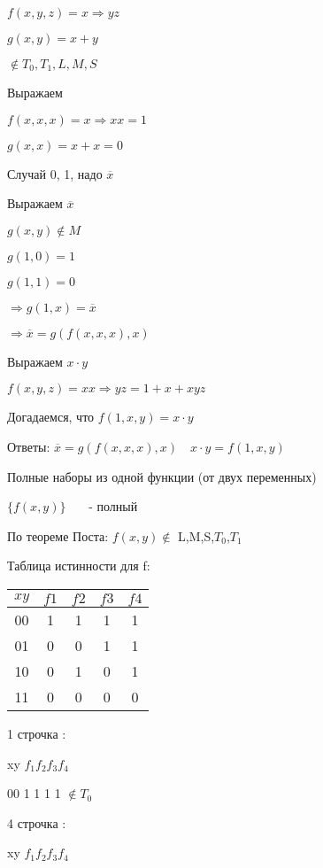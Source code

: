 \documentclass[russian]{lecture-notes}
\begin{document}
\begin{example}
	$f(x, y, z) = x \Rightarrow yz$
	
	
	$g(x, y) = x + y$
	
	$\notin T_0, T_1, L, M, S$
	
	Выражаем
	
	$f(x, x, x) = x \Rightarrow xx = 1$
	
	$g(x, x) = x + x = 0$
	
	Случай 0, 1, надо $\overline{x}$
	
	Выражаем $\overline{x}$
	
	$g(x, y) \notin M$
	
	$g(1, 0) = 1$
	
	$g(1, 1) = 0$
	
	$\Rightarrow g(1, x) = \overline{x}$
	
	$\Rightarrow \overline{x} = g(f(x, x, x), x)$
	
	Выражаем $x \cdot y$
	
	$f(x, y, z) = xx \Rightarrow yz = 1 + x + xyz$
	
	Догадаемся, что $f(1, x, y) = x \cdot y$
	
	Ответы: $\overline{x} = g(f(x, x, x), x) \quad x \cdot y = f(1, x, y)$
\end{example}


	Полные наборы из одной функции (от двух переменных)

	$\{f(x,y)\}$ ~~~- полный

	По теореме Поста: $f(x,y) \notin $ L,M,S,$T_{0}$,$T_{1}$

	Таблица истинности для f:

	\begin{table}[h!]
	\begin{tabular}{|c|c|c|c|c|}
		\hline
		$xy$ & $f1$ & $f2$ & $f3$ & $f4$\\ \hline
		00 & 1 & 1 & 1 & 1 \\ \hline
		01 & 0 & 0 & 1 & 1\\ \hline
		10 & 0 & 1 & 0 & 1\\ \hline
		11 & 0 & 0 & 0 & 0 \\ \hline
\end{tabular}
\end{table}

	1 строчка :

	xy $f_{1} f_{2} f_{3} f_{4}$

	00 1 1 1 1 $\notin T_{0}$

	4 строчка :

	xy $f_{1} f_{2} f_{3} f_{4}$
\end{document}
